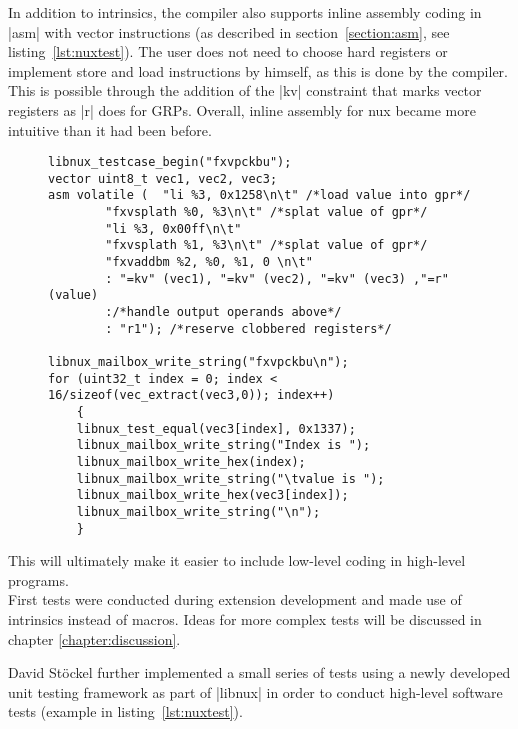 In addition to intrinsics, the compiler also supports inline assembly coding in |asm| with vector instructions (as described in section~\ref{section:asm}, see listing~\ref{lst:nuxtest}).
The user does not need to choose hard registers or implement store and load instructions by himself, as this is done by the compiler.
This is possible through the addition of the |kv| constraint that marks vector registers as |r| does for GRPs.
Overall, inline assembly for nux became more intuitive than it had been before.
\begin{figure}[htb]
{
\begin{lstlisting}[caption={Example of a nux Test.\hspace{\textwidth} This This test directly loads two values as immediates into registers and splats them into vector registers. Those vector registers are added and the result is saved in a variable. The result is then tested and also written into the mailbox for analysis.}, label=lst:nuxtest]
libnux_testcase_begin("fxvpckbu");
vector uint8_t vec1, vec2, vec3;
asm volatile (	"li %3, 0x1258\n\t" /*load value into gpr*/ 
		"fxvsplath %0, %3\n\t" /*splat value of gpr*/ 
		"li %3, 0x00ff\n\t"
		"fxvsplath %1, %3\n\t" /*splat value of gpr*/ 
		"fxvaddbm %2, %0, %1, 0 \n\t"
		: "=kv" (vec1), "=kv" (vec2), "=kv" (vec3) ,"=r" (value)
        :/*handle output operands above*/
		: "r1"); /*reserve clobbered registers*/

libnux_mailbox_write_string("fxvpckbu\n");
for (uint32_t index = 0; index < 16/sizeof(vec_extract(vec3,0)); index++)
    {
	libnux_test_equal(vec3[index], 0x1337);
	libnux_mailbox_write_string("Index is ");
	libnux_mailbox_write_hex(index);
	libnux_mailbox_write_string("\tvalue is ");
	libnux_mailbox_write_hex(vec3[index]);
	libnux_mailbox_write_string("\n");
	}
\end{lstlisting}
}
\end{figure}

This will ultimately make it easier to include low-level coding in high-level programs.
\\
First tests were conducted during extension development and made use of intrinsics instead of macros.
Ideas for more complex tests will be discussed in chapter \ref{chapter:discussion}.

David Stöckel further implemented a small series of tests using a newly developed unit testing framework as part of |libnux| in order to conduct high-level software tests (example in listing~\ref{lst:nuxtest}).

